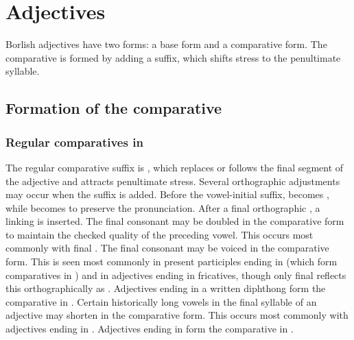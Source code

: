 \chapter{Adjectives}\label{ch:adjectives}

Borlish adjectives have two forms: a base form and a comparative form. The comparative is formed by adding a suffix, which shifts stress to the penultimate syllable.

\section{Formation of the comparative}\label{sec:comparative-formation}

\subsection{Regular comparatives in }
The regular comparative suffix is , which replaces or follows the final segment of the adjective and attracts penultimate stress.
Several orthographic adjustments may occur when the suffix is added. Before the vowel-initial suffix,  becomes , while  becomes  to preserve the  pronunciation.
After a final orthographic , a linking  is inserted.
The final consonant may be doubled in the comparative form to maintain the checked quality of the preceding vowel. This occurs most commonly with final .
The final consonant may be voiced in the comparative form. This is seen most commonly in present participles ending in  (which form comparatives in ) and in adjectives ending in fricatives, though only final  reflects this orthographically as .
Adjectives ending in a written  diphthong form the comparative in .
Certain historically long vowels in the final syllable of an adjective may shorten in the comparative form. This occurs most commonly with adjectives ending in .
Adjectives ending in  form the comparative in .

